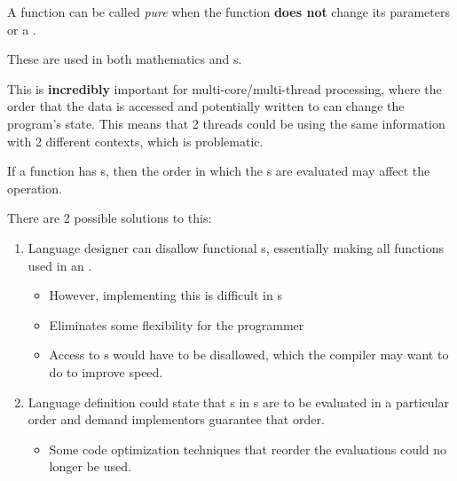 \begin{definition}[Pure]\label{def:Function_Pure}
  A function can be called \emph{pure} when the function \textbf{does not} change its parameters or a .

  \begin{remark}
    These are used in both mathematics and s.
  \end{remark}

  \begin{remark}
    This is \textbf{incredibly} important for multi-core/multi-thread processing, where the order that the data is accessed and potentially written to can change the program's state.
    This means that 2 threads could be using the same information with 2 different contexts, which is problematic.
  \end{remark}
\end{definition}
If a function has s, then the order in which the s are evaluated may affect the operation.

There are 2 possible solutions to this:
\begin{enumerate}[noitemsep]
\item Language designer can disallow functional s, essentially making all functions used in an  .
  \begin{itemize}[noitemsep]
  \item However, implementing this is difficult in s
  \item Eliminates some flexibility for the programmer
  \item Access to s would have to be disallowed, which the compiler may want to do to improve speed.
  \end{itemize}
\item Language definition could state that s in s are to be evaluated in a particular order and demand implementors guarantee that order.
  \begin{itemize}[noitemsep]
  \item Some code optimization techniques that reorder the  evaluations could no longer be used.
  \end{itemize}
\end{enumerate}


